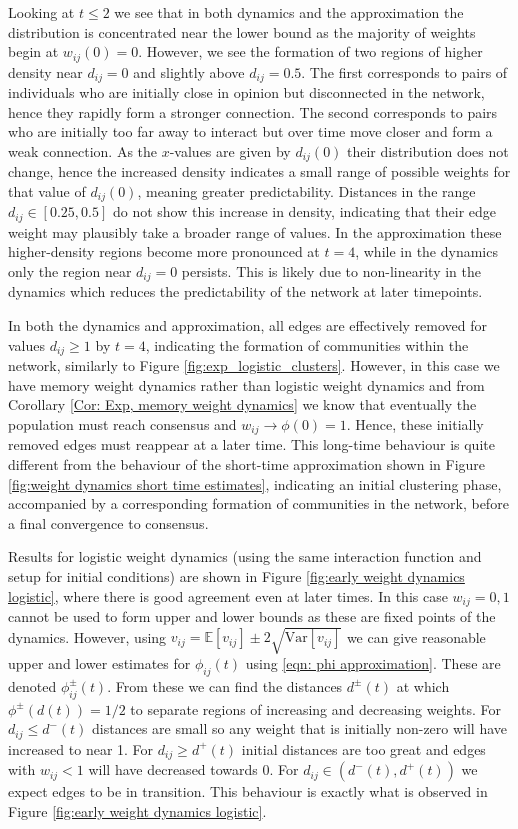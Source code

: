 \documentclass{article}
\newcommand{\EE}{\mathds{E}}
\newcommand{\var}{\text{Var}}
\begin{document}
Looking at $t\leq2$ we see that in both dynamics and the approximation the distribution is concentrated near the lower bound as the majority of weights begin at $w_{ij}(0)=0$. However, we see the formation of two regions of higher density near $d_{ij}=0$ and slightly above $d_{ij}=0.5$. The first corresponds to pairs of individuals who are initially close in opinion but disconnected in the network, hence they rapidly form a stronger connection. The second corresponds to pairs who are initially too far away to interact but over time move closer and form a weak connection. As the $x$-values are given by $d_{ij}(0)$ their distribution does not change, hence the increased density indicates a small range of possible weights for that value of $d_{ij}(0)$, meaning greater predictability. Distances in the range $d_{ij}\in [0.25,0.5]$ do not show this increase in density, indicating that their edge weight may plausibly take a broader range of values. In the approximation these higher-density regions become more pronounced at $t=4$, while in the dynamics only the region near $d_{ij}=0$ persists. This is likely due to non-linearity in the dynamics which reduces the predictability of the network at later timepoints. 

In both the dynamics and approximation, all edges are effectively removed for values $d_{ij}\geq 1$ by $t=4$, indicating the formation of communities within the network, similarly to Figure \ref{fig:exp_logistic_clusters}. However, in this case we have memory weight dynamics rather than logistic weight dynamics and from Corollary \ref{Cor: Exp, memory weight dynamics} we know that eventually the population must reach consensus and $w_{ij}\rightarrow \phi(0)=1$. Hence, these initially removed edges must reappear at a later time. This long-time behaviour is quite different from the behaviour of the short-time approximation shown in Figure \ref{fig:weight dynamics short time estimates}, indicating an initial clustering phase, accompanied by a corresponding formation of communities in the network, before a final convergence to consensus. 

Results for logistic weight dynamics (using the same interaction function and setup for initial conditions) are shown in Figure \ref{fig:early weight dynamics logistic}, where there is good agreement even at later times. In this case $w_{ij}=0,1$ cannot be used to form upper and lower bounds as these are fixed points of the dynamics. However, using $v_{ij} = \EE[v_{ij}] \pm 2\sqrt{\var{[v_{ij}]}}$ we can give reasonable upper and lower estimates for $\phi_{ij}(t)$ using \eqref{eqn: phi approximation}. These are denoted $\phi_{ij}^\pm(t)$. From these we can find the distances $d^\pm(t)$ at which $\phi^\pm(d(t))=1/2$ to separate regions of increasing and decreasing weights. For $d_{ij}\leq d^-(t)$ distances are small so any weight that is initially non-zero will have increased to near 1. For $d_{ij}\geq d^+(t)$ initial distances are too great and edges with $w_{ij}<1$ will have decreased towards 0. For $d_{ij} \in (d^-(t),d^+(t))$ we expect edges to be in transition. This behaviour is exactly what is observed in Figure \ref{fig:early weight dynamics logistic}. 
\end{document}
